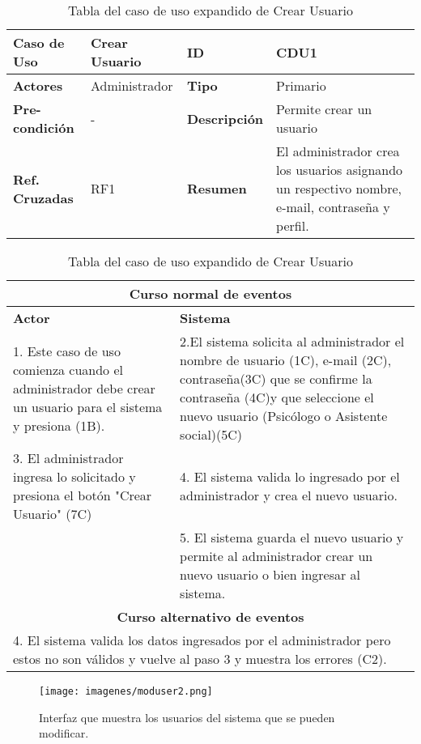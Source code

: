 \begin{table}
	\centering
	\begin{tabular}{|p{3cm}|p{3cm}|p{2.3cm} |p{5cm}|}
		\hline \textbf{Caso de Uso} & Crear Usuario & \textbf{ID} & CDU1 \\ 
		\hline \textbf{Actores} & Administrador & \textbf{Tipo} & Primario \\ 
		\hline \textbf{Pre-condición} & - & \textbf{Descripción} & Permite crear un usuario\\
		\hline \textbf{Ref. Cruzadas} & RF1 & \textbf{Resumen} & El administrador crea los usuarios asignando un respectivo nombre, e-mail, contraseña y perfil.\\ 
		\hline
	\end{tabular}  
	
	\begin{tabular}{|p{8cm}|p{6cm}|}
		
		\multicolumn{2}{|c|}{\textbf{Curso normal de eventos}} \\
		\hline \textbf{Actor} & \textbf{Sistema} \\ 
		\hline 1. Este caso de uso comienza cuando el administrador debe crear un usuario para el sistema y presiona (1B). & 2.El sistema solicita al administrador el nombre de usuario (1C), e-mail (2C), contraseña(3C) que se confirme la contraseña (4C)y que seleccione el nuevo usuario (Psicólogo o Asistente social)(5C)  \\ 
		3. El administrador ingresa lo solicitado y presiona el botón "Crear Usuario" (7C) & 4. El sistema valida lo ingresado por el administrador y crea el nuevo usuario. \\
		& 5. El sistema guarda el nuevo usuario y permite al administrador crear un nuevo usuario o bien ingresar al sistema. \\
		\hline
		\multicolumn{2}{|c|}{\textbf{Curso alternativo de eventos}} \\
		\hline
		\multicolumn{2}{|p{12cm}|}{4. El sistema valida los datos ingresados por el administrador pero estos no son válidos y vuelve al paso 3 y muestra los errores (C2).} \\
		\hline
	\end{tabular}
	\caption{Tabla del caso de uso expandido de Crear Usuario}
	\label{tabcdu1.1}
\end{table}
\clearpage
\begin{figure}[h!]
	\label{moduser2}
	\begin{center}
		\texttt{[image: imagenes/moduser2.png]}
	\end{center}
	\caption{Interfaz que muestra los usuarios del sistema que se pueden modificar.}
\end{figure}
